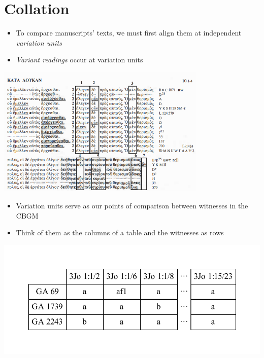 \documentclass[10pt]{beamer}
\begin{document}
	\section*{Collation}
	\begin{frame}
		\begin{itemize}
			\item To compare manuscripts' texts, we must first align them at independent \emph{variation units}
			\item \emph{Variant readings} occur at variation units
		\end{itemize}
		\begin{center}
			\includegraphics[width=0.75\textwidth]{../img/swanson-luke-10-2-variation-units.png}
		\end{center}
		\footnotesize\parencite[Source:][183]{Swanson.Luke}
	\end{frame}
	\begin{frame}
		\begin{itemize}
			\item Variation units serve as our points of comparison between witnesses in the CBGM
			\item Think of them as the columns of a table and the witnesses as rows
		\end{itemize}
		\begin{center}
			\includegraphics[scale=0.5]{../img/witnesses.pdf}
		\end{center}
	\end{frame}
\end{document}
